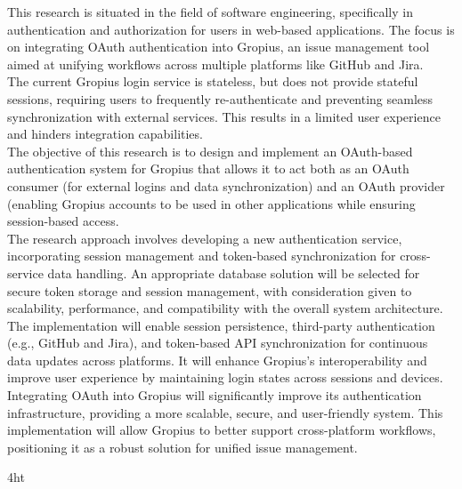 \documentclass[
    fontsize=12pt, %
    paper=a4,
    twoside, %
    BCOR=3mm, %
    DIV=13,   %
    headinclude=true,
    footinclude=false,
    bibliography=totoc,
    headsepline,
    cleardoublepage=empty,
    parskip=half,
    final   %
]{scrbook}
\begin{document}
This research is situated in the field of software engineering, specifically in authentication and authorization for users in web-based applications.
The focus is on integrating OAuth authentication into Gropius, an issue management tool aimed at unifying workflows across multiple platforms like GitHub and Jira.\\
The current Gropius login service is stateless, but does not provide stateful sessions, requiring users to frequently re-authenticate and preventing seamless synchronization with external services.
This results in a limited user experience and hinders integration capabilities.\\
The objective of this research is to design and implement an OAuth-based authentication system for
Gropius that allows it to act both as an OAuth consumer (for external logins and data synchronization) and an OAuth provider
(enabling Gropius accounts to be used in other applications while ensuring session-based access.\\
The research approach involves developing a new authentication service,
incorporating session management and token-based synchronization for cross-service data handling.
An appropriate database solution will be selected for secure token storage and session management, with consideration
given to scalability, performance, and compatibility with the overall system architecture.\\
The implementation will enable session persistence, third-party authentication (e.g., GitHub and Jira),
and token-based API synchronization for continuous data updates across platforms.
It will enhance Gropius’s interoperability and improve user experience by maintaining login states across sessions and devices.\\
Integrating OAuth into Gropius will significantly improve its authentication infrastructure,
providing a more scalable, secure, and user-friendly system. This implementation will allow Gropius to better support cross-platform workflows,
positioning it as a robust solution for unified issue management.




\iftex4ht
\else
{}
\fi
\end{document}
